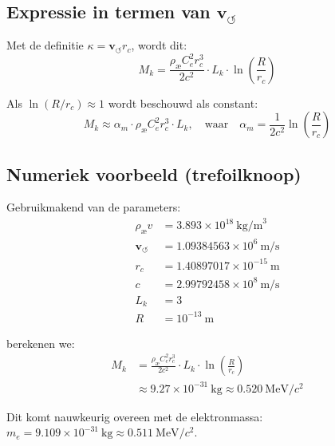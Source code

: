 \subsection{Expressie in termen van \( \mathbf{v}_{\scriptscriptstyle\boldsymbol{\circlearrowleft}} \)}
Met de definitie \( \kappa = \mathbf{v}_{\scriptscriptstyle\boldsymbol{\circlearrowleft}} r_c \), wordt dit:
\begin{equation}
    M_k = \frac{\rho_\text{\ae} C_e^2 r_c^3}{2 c^2} \cdot L_k \cdot \ln\left( \frac{R}{r_c} \right)
\end{equation}

Als \( \ln(R/r_c) \approx 1 \) wordt beschouwd als constant:
\begin{equation}
    M_k \approx \alpha_m \cdot \rho_\text{\ae} C_e^2 r_c^3 \cdot L_k, \quad \text{waar} \quad \alpha_m = \frac{1}{2c^2} \ln\left( \frac{R}{r_c} \right)
\end{equation}

\subsection*{Numeriek voorbeeld (trefoilknoop)}
Gebruikmakend van de parameters:
\begin{align*}
    \rho_\text{\ae} v&= 3.893 \times 10^{18}~\text{kg/m}^3 \\
    \mathbf{v}_{\scriptscriptstyle\boldsymbol{\circlearrowleft}} &= 1.09384563 \times 10^6~\text{m/s} \\
    r_c &= 1.40897017 \times 10^{-15}~\text{m} \\
    c &= 2.99792458 \times 10^8~\text{m/s} \\
    L_k &= 3 \\
    R &= 10^{-13}~\text{m}
\end{align*}

berekenen we:
\begin{align*}
    M_k &= \frac{\rho_\text{\ae} C_e^2 r_c^3}{2 c^2} \cdot L_k \cdot \ln\left( \frac{R}{r_c} \right) \\
    &\approx 9.27 \times 10^{-31}~\text{kg} \approx 0.520~\text{MeV}/c^2
\end{align*}

Dit komt nauwkeurig overeen met de elektronmassa: \( m_e = 9.109 \times 10^{-31}~\text{kg} \approx 0.511~\text{MeV}/c^2 \).